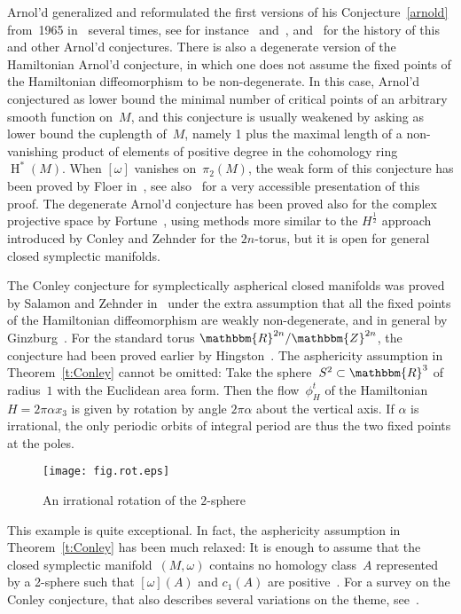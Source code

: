 \documentclass[12pt,twoside]{amsart}
\theoremstyle{plain}
\numberwithin{figure}{section}
\numberwithin{equation}{section}
\def\H{\operatorname{H}}
\def\ga{\alpha}
\def\go{\omega}
\def\RR{\mathbbm{R}}
\def\ZZ{\mathbbm{Z}}
\def\ni{\noindent}
\begin{document}
Arnol'd generalized and reformulated the first versions of his Conjecture~\ref{arnold} from~1965 
in~\cite{Arn65} several times, 
see for instance~\cite[Problem~20 on p.\ 66]{Arn76} and~\cite[Appendix~9]{Arn78}, 
and~\cite{Aud14} for the history of this and other Arnol'd conjectures.
There is also a degenerate version of the Hamiltonian Arnol'd conjecture, 
in which one does not assume the fixed points of the Hamiltonian diffeomorphism to be non-degenerate. 
In this case, Arnol'd conjectured as lower bound the minimal number of critical points of an arbitrary smooth function on~$M$, and this conjecture is usually weakened by asking as lower bound the cuplength of~$M$,
namely 1 plus the maximal length of a non-vanishing product of elements of positive degree in the cohomology
ring~$\H^*(M)$.  
When $[\omega]$ vanishes on~$\pi_2(M)$, the weak form of this conjecture has been proved by Floer 
in~\cite{Flo89:cup}, see also~\cite[\S 6.4]{HoZe94} for a very accessible presentation of this proof. 
The degenerate Arnol'd conjecture has been proved also for the complex projective space 
by Fortune~\cite{for85}, using methods more similar to the $H^{\frac 12}$ approach introduced by Conley and Zehnder for the $2n$-torus, but it is open for general closed symplectic manifolds.

The Conley conjecture for symplectically aspherical closed manifolds was proved by Salamon and Zehnder in~\cite{SaZe92} under the extra assumption that all the fixed points of the Hamiltonian diffeomorphism are weakly non-degenerate, and in general by Ginzburg~\cite{Gi10}. 
For the standard torus $\RR^{2n}/ \ZZ^{2n}$, the conjecture had been proved earlier by Hingston~\cite{Hi09}.
%
The asphericity assumption in Theorem~\ref{t:Conley} cannot be omitted:
Take the sphere~$S^2 \subset \RR^3$ of radius~$1$ with the Euclidean area form. 
Then the flow~$\phi_H^t$ of the Hamiltonian $H = 2 \pi \ga x_3$ is 
given by rotation by angle $2\pi \ga$ about the vertical axis.
If $\ga$ is irrational, the only periodic orbits of integral period are thus 
the two fixed points at the poles.

%
\begin{figure}[h]   
 \begin{center} 
  \psfrag{H}{$H = 2 \pi \ga x_3$}
  \leavevmode\texttt{[image: fig.rot.eps]}
 \end{center}
 \caption{An irrational rotation of the $2$-sphere}
 \label{fig.rot}
\end{figure}
%

\ni
This example is quite exceptional. 
In fact, the asphericity assumption in Theorem~\ref{t:Conley} has been much relaxed: 
It is enough to assume that the closed symplectic manifold~$(M,\go)$ 
contains no homology class~$A$ represented by a 2-sphere such that $[\go] (A)$ and $c_1 (A)$
are positive~\cite{GiGu16}. 
For a survey on the Conley conjecture, that also describes several variations on the theme,
see~\cite{GiGu15}.
\end{document}
